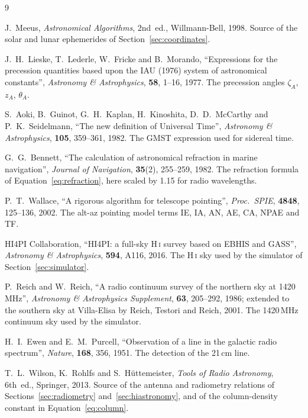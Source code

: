\documentclass[11pt,a4paper]{article}
\begin{document}
\begin{thebibliography}{9}

J.~Meeus, \emph{Astronomical Algorithms}, 2nd~ed., Willmann-Bell, 1998.
Source of the solar and lunar ephemerides of Section~\ref{sec:coordinates}.

J.~H.~Lieske, T.~Lederle, W.~Fricke and B.~Morando,
``Expressions for the precession quantities based upon the IAU (1976) system of astronomical constants'',
\emph{Astronomy \& Astrophysics}, \textbf{58}, 1--16, 1977.
The precession angles $\zeta_A$, $z_A$, $\theta_A$.

S.~Aoki, B.~Guinot, G.~H.~Kaplan, H.~Kinoshita, D.~D.~McCarthy and P.~K.~Seidelmann,
``The new definition of Universal Time'',
\emph{Astronomy \& Astrophysics}, \textbf{105}, 359--361, 1982.
The GMST expression used for sidereal time.

G.~G.~Bennett, ``The calculation of astronomical refraction in marine navigation'',
\emph{Journal of Navigation}, \textbf{35}(2), 255--259, 1982.
The refraction formula of Equation~\eqref{eq:refraction}, here scaled by 1.15 for radio wavelengths.

P.~T.~Wallace, ``A rigorous algorithm for telescope pointing'',
\emph{Proc.\ SPIE}, \textbf{4848}, 125--136, 2002.
The alt-az pointing model terms IE, IA, AN, AE, CA, NPAE and TF.

HI4PI Collaboration, ``HI4PI: a full-sky H\,\textsc{i} survey based on EBHIS and GASS'',
\emph{Astronomy \& Astrophysics}, \textbf{594}, A116, 2016.
The H\,\textsc{i} sky used by the simulator of Section~\ref{sec:simulator}.

P.~Reich and W.~Reich, ``A radio continuum survey of the northern sky at 1420\,MHz'',
\emph{Astronomy \& Astrophysics Supplement}, \textbf{63}, 205--292, 1986;
extended to the southern sky at Villa-Elisa by Reich, Testori and Reich, 2001.
The 1420\,MHz continuum sky used by the simulator.

H.~I.~Ewen and E.~M.~Purcell, ``Observation of a line in the galactic radio spectrum'',
\emph{Nature}, \textbf{168}, 356, 1951.
The detection of the 21\,cm line.

T.~L.~Wilson, K.~Rohlfs and S.~H\"uttemeister, \emph{Tools of Radio Astronomy}, 6th~ed., Springer, 2013.
Source of the antenna and radiometry relations of Sections~\ref{sec:radiometry} and~\ref{sec:hiastronomy}, and of the column-density constant in Equation~\eqref{eq:column}.


\end{thebibliography}
\end{document}
